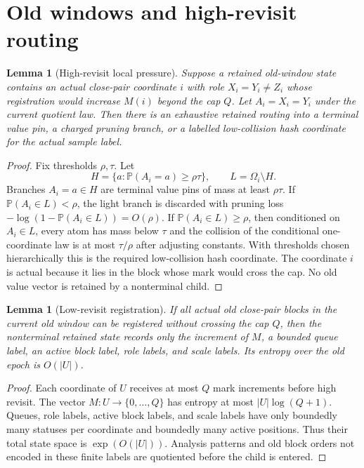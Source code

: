 \documentclass[11pt]{article}
\newtheorem{lemma}[theorem]{Lemma}
\theoremstyle{remark}
\newcommand{\Prob}{\mathbb P}
\begin{document}
\section{Old windows and high-revisit routing}\label{app:old-window}

\begin{lemma}[High-revisit local pressure]\label{lem:app-high-revisit}
Suppose a retained old-window state contains an actual close-pair coordinate $i$ with role $X_i=Y_i\ne Z_i$ whose registration would increase $M(i)$ beyond the cap $Q$.  Let $A_i=X_i=Y_i$ under the current quotient law.  Then there is an exhaustive retained routing into a terminal value pin, a charged pruning branch, or a labelled low-collision hash coordinate for the actual sample label.
\end{lemma}

\begin{proof}
Fix thresholds $\rho,\tau$.  Let
\[
        H=\{a:\Prob(A_i=a)\ge \rho\tau\},\qquad L=\Omega_i\setminus H.
\]
Branches $A_i=a\in H$ are terminal value pins of mass at least $\rho\tau$.  If $\Prob(A_i\in L)<\rho$, the light branch is discarded with pruning loss $-\log(1-\Prob(A_i\in L))=O(\rho)$.  If $\Prob(A_i\in L)\ge \rho$, then conditioned on $A_i\in L$, every atom has mass below $\tau$ and the collision of the conditional one-coordinate law is at most $\tau/\rho$ after adjusting constants.  With thresholds chosen hierarchically this is the required low-collision hash coordinate.  The coordinate $i$ is actual because it lies in the block whose mark would cross the cap.  No old value vector is retained by a nonterminal child.
\end{proof}

\begin{lemma}[Low-revisit registration]\label{lem:app-low-revisit}
If all actual old close-pair blocks in the current old window can be registered without crossing the cap $Q$, then the nonterminal retained state records only the increment of $M$, a bounded queue label, an active block label, role labels, and scale labels.  Its entropy over the old epoch is $O(|U|)$.
\end{lemma}

\begin{proof}
Each coordinate of $U$ receives at most $Q$ mark increments before high revisit.  The vector $M:U\to\{0,\ldots,Q\}$ has entropy at most $|U|\log(Q+1)$.  Queues, role labels, active block labels, and scale labels have only boundedly many statuses per coordinate and boundedly many active positions.  Thus their total state space is $\exp(O(|U|))$.  Analysis patterns and old block orders not encoded in these finite labels are quotiented before the child is entered.
\end{proof}
\end{document}
